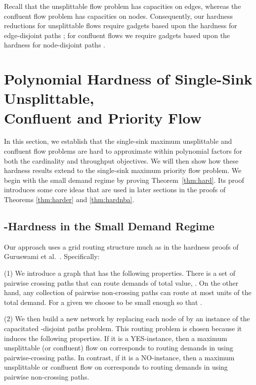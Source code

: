 \documentclass[12pt]{article}
\begin{document}
Recall that the unsplittable flow problem has capacities on edges, whereas
the confluent flow problem has capacities on nodes.
Consequently, our hardness reductions for
unsplittable flows  require gadgets based upon
the hardness for edge-disjoint paths \cite{naves2010maximum};
for confluent flows we  require gadgets based upon
the hardness for node-disjoint paths \cite{guruswami2003near}.







\section{Polynomial Hardness of Single-Sink Unsplittable,\\ Confluent and Priority Flow}
\label{sec:lower}


In this section, we establish that the single-sink maximum unsplittable and confluent flow problems
are hard to approximate within polynomial factors for both the cardinality and throughput objectives.
We will then show how these hardness results extend to the single-sink maximum priority flow problem.
We begin with the small demand regime by proving Theorem~\ref{thm:hard}.
Its proof introduces some core ideas that are used in later sections
in the proofs of Theorems \ref{thm:harder} and \ref{thm:hardnba}.






\subsection{-Hardness in the Small Demand Regime}
\label{sec:hardness}



Our approach uses a grid routing structure much as in the hardness proofs of Guruswami et al.~\cite{guruswami2003near}.
Specifically:

(1) We introduce a graph  that has the following properties.
There is a set of pairwise crossing paths that can route demands of total value,
.  On the other hand, any collection of pairwise non-crossing
paths can route at most  units of the total demand. For a given   we
choose  to be small enough so that .

(2) We then build a new network  by replacing each node of  by
an instance of the capacitated -disjoint paths problem. This routing problem is chosen
because it induces the following properties.  If it is a YES-instance, then a maximum unsplittable (or confluent) flow on
 corresponds to routing demands in  using pairwise-crossing paths. In contrast, if it is a
NO-instance, then a maximum unsplittable or confluent flow on   corresponds to routing
demands in  using pairwise non-crossing paths.
\end{document}
